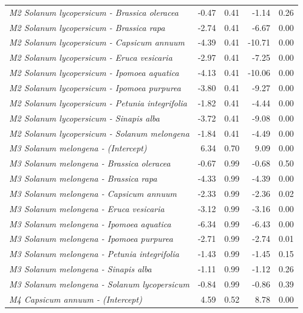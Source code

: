 \documentclass[12pt,]{article}
\begin{document}
\begin{longtable}[t]{>{\em}lrrrr}
\addlinespace
M2 Solanum lycopersicum - Brassica oleracea & -0.47 & 0.41 & -1.14 & 0.26\\
\addlinespace
\rowcolor{gray!6}  M2 Solanum lycopersicum - Brassica rapa & -2.74 & 0.41 & -6.67 & 0.00\\
\addlinespace
M2 Solanum lycopersicum - Capsicum annuum & -4.39 & 0.41 & -10.71 & 0.00\\
\addlinespace
\rowcolor{gray!6}  M2 Solanum lycopersicum - Eruca vesicaria & -2.97 & 0.41 & -7.25 & 0.00\\
\addlinespace
M2 Solanum lycopersicum - Ipomoea aquatica & -4.13 & 0.41 & -10.06 & 0.00\\
\addlinespace
\rowcolor{gray!6}  M2 Solanum lycopersicum - Ipomoea purpurea & -3.80 & 0.41 & -9.27 & 0.00\\
\addlinespace
M2 Solanum lycopersicum - Petunia integrifolia & -1.82 & 0.41 & -4.44 & 0.00\\
\addlinespace
\rowcolor{gray!6}  M2 Solanum lycopersicum - Sinapis alba & -3.72 & 0.41 & -9.08 & 0.00\\
\addlinespace
M2 Solanum lycopersicum - Solanum melongena & -1.84 & 0.41 & -4.49 & 0.00\\
\addlinespace
\rowcolor{gray!6}  M3 Solanum melongena - (Intercept) & 6.34 & 0.70 & 9.09 & 0.00\\
\addlinespace
M3 Solanum melongena - Brassica oleracea & -0.67 & 0.99 & -0.68 & 0.50\\
\addlinespace
\rowcolor{gray!6}  M3 Solanum melongena - Brassica rapa & -4.33 & 0.99 & -4.39 & 0.00\\
\addlinespace
M3 Solanum melongena - Capsicum annuum & -2.33 & 0.99 & -2.36 & 0.02\\
\addlinespace
\rowcolor{gray!6}  M3 Solanum melongena - Eruca vesicaria & -3.12 & 0.99 & -3.16 & 0.00\\
\addlinespace
M3 Solanum melongena - Ipomoea aquatica & -6.34 & 0.99 & -6.43 & 0.00\\
\addlinespace
\rowcolor{gray!6}  M3 Solanum melongena - Ipomoea purpurea & -2.71 & 0.99 & -2.74 & 0.01\\
\addlinespace
M3 Solanum melongena - Petunia integrifolia & -1.43 & 0.99 & -1.45 & 0.15\\
\addlinespace
\rowcolor{gray!6}  M3 Solanum melongena - Sinapis alba & -1.11 & 0.99 & -1.12 & 0.26\\
\addlinespace
M3 Solanum melongena - Solanum lycopersicum & -0.84 & 0.99 & -0.86 & 0.39\\
\addlinespace
\rowcolor{gray!6}  M4 Capsicum annuum - (Intercept) & 4.59 & 0.52 & 8.78 & 0.00\\

\end{longtable}
\end{document}

